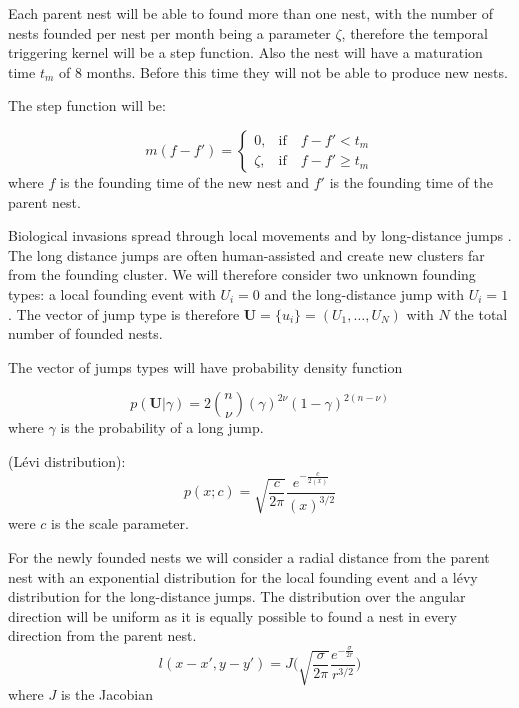 \documentclass[11pt,a4paper]{article}
\renewcommand{\vec}[1]{\mathbf{#1}}
\begin{document}
Each parent nest will be able to found more than one nest, with the number of nests founded per nest per month being a parameter $\zeta$, therefore the temporal triggering kernel will be a step function. Also the nest will have a maturation time $t_m$ of 8 months. Before this time they will not be able to produce new nests. 

The step function will be:

\[
m (f - f') =
\begin{cases}
0, & \mbox{if} \quad f - f' < t_{m} \\
\zeta, & \mbox{if} \quad f - f' \geq t_{m}
\end{cases}
\]
where $f$ is the founding time of the new nest and $f'$ is the founding time of the parent nest.

{\color{red} Biological invasions spread through local movements and by long-distance jumps \cite{Suarez}. The long distance jumps are often human-assisted and create new clusters far from the founding cluster. We will therefore consider two unknown founding types: a local founding event with $U_i = 0$ and the long-distance jump with $U_i = 1$. The vector of jump type is therefore $\vec{U} = \{u_i\} = (U_1, \dots, U_N)$ with $N$ the total number of founded nests.

The vector of jumps types will have probability density function

\begin{equation*}
    p(\vec{U} | \gamma ) = 2{n \choose \nu}(\gamma)^{2\nu}(1 - \gamma)^{2(n - \nu)}
\end{equation*}
where $\gamma$ is the probability of a long jump.

(L\'evi distribution):
\begin{equation*}
  p(x; c ) = \sqrt{\frac{c}{2\pi}} \frac{e^{-\frac{c}{2(x)}}}{(x)^{3/2}}  
\end{equation*}
were $c$ is the scale parameter.}

For the newly founded nests we will consider a radial distance from the parent nest with an exponential distribution for the local founding event and a {\color{red}l\'evy distribution for the long-distance jumps}. The distribution over the angular direction will be uniform as it is equally possible to found a nest in every direction from the parent nest.
{\color{red}
\begin{equation}
l(x - x', y - y')= J \bigg(\sqrt{\frac{\sigma}{2 \pi}} \frac{e^{- \frac{\sigma}{ 2 r}}}{r^{3/2}}\bigg)
\end{equation}}
where $J$ is the Jacobian
\end{document}
